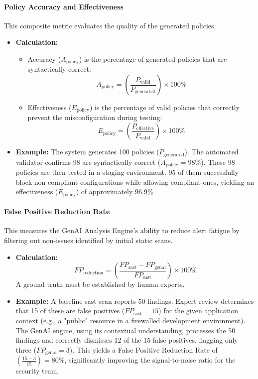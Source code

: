 \paragraph{Policy Accuracy and Effectiveness} This composite metric evaluates the quality of the generated policies.
\begin{itemize}
    \item \textbf{Calculation:}
        \begin{itemize}
            \item Accuracy (\( A_{\text{policy}} \)) is the percentage of generated policies that are syntactically correct:
            \[ A_{\text{policy}} = \left(\frac{P_{\text{valid}}}{P_{\text{generated}}}\right) \times 100\% \]
            \item Effectiveness (\( E_{\text{policy}} \)) is the percentage of valid policies that correctly prevent the misconfiguration during testing:
            \[ E_{\text{policy}} = \left(\frac{P_{\text{effective}}}{P_{\text{valid}}}\right) \times 100\% \]
        \end{itemize}
    \item \textbf{Example:} The system generates 100 policies (\( P_{\text{generated}} \)). The automated validator confirms 98 are syntactically correct (\( A_{\text{policy}} = 98\% \)). These 98 policies are then tested in a staging environment. 95 of them successfully block non-compliant configurations while allowing compliant ones, yielding an effectiveness (\( E_{\text{policy}} \)) of approximately 96.9\%.
\end{itemize}

\paragraph{False Positive Reduction Rate} This measures the GenAI Analysis Engine's ability to reduce alert fatigue by filtering out non-issues identified by initial static scans.
\begin{itemize}
    \item \textbf{Calculation:} \[ FP_{\text{reduction}} = \left(\frac{FP_{\text{sast}} - FP_{\text{genai}}}{FP_{\text{sast}}}\right) \times 100\% \] A ground truth must be established by human experts.
    \item \textbf{Example:} A baseline \gls{sast} scan reports 50 findings. Expert review determines that 15 of these are false positives (\( FP_{\text{sast}} = 15 \)) for the given application context (e.g., a "public" resource in a firewalled development environment). The GenAI engine, using its contextual understanding, processes the 50 findings and correctly dismisses 12 of the 15 false positives, flagging only three (\( FP_{\text{genai}} = 3 \)). This yields a False Positive Reduction Rate of \( \left(\frac{15 - 3}{15}\right) = 80\% \), significantly improving the signal-to-noise ratio for the security team.
\end{itemize}

